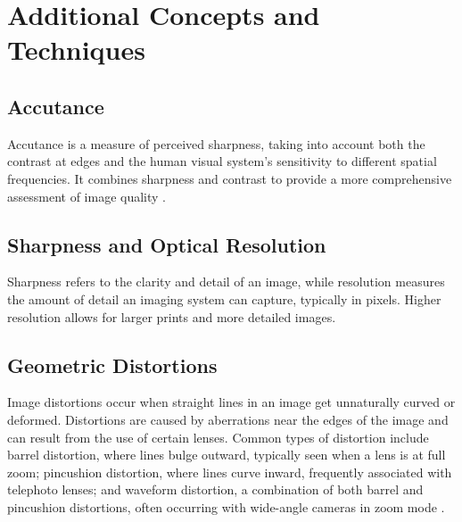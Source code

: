 \section{Additional Concepts and Techniques}

\subsection{Accutance}
Accutance is a measure of perceived sharpness, taking into account both the contrast at edges and the human visual system's sensitivity to different spatial frequencies. It combines sharpness and contrast to provide a more comprehensive assessment of image quality \cite{accutance} .

\subsection{Sharpness and Optical Resolution}
Sharpness refers to the clarity and detail of an image, while resolution measures the amount of detail an imaging system can capture, typically in pixels. Higher resolution allows for larger prints and more detailed images.

\subsection{Geometric Distortions}
Image distortions occur when straight lines in an image get unnaturally curved or deformed. Distortions are caused by aberrations near the edges of the image and can result from the use of certain lenses. Common types of distortion include barrel distortion, where lines bulge outward, typically seen when a lens is at full zoom; pincushion distortion, where lines curve inward, frequently associated with telephoto lenses; and waveform distortion, a combination of both barrel and pincushion distortions, often occurring with wide-angle cameras in zoom mode \cite{distortions}.

